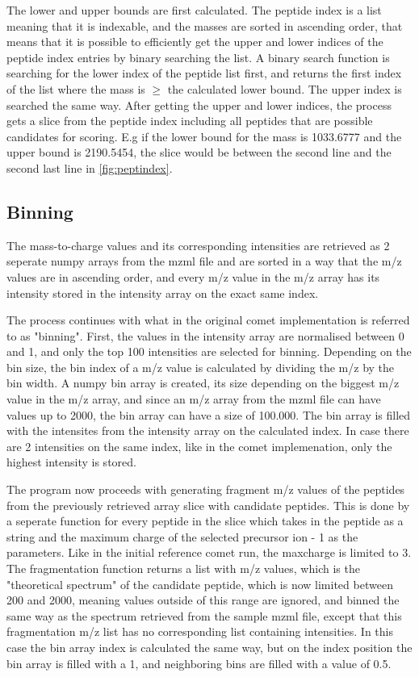 \documentclass[11pt]{article}
\begin{document}
The lower and upper bounds are first calculated. The peptide index is a list meaning that it is indexable, and the masses are sorted in ascending order, that means that it is possible to efficiently get the upper and lower indices of the peptide index entries by binary searching the list. A binary search function is searching for the lower index of the peptide list first, and returns the first index of the list where the mass is $\ge$ the calculated lower bound. The upper index is searched the same way. After getting the upper and lower indices, the process gets a slice from the peptide index including all peptides that are possible candidates for scoring. E.g if the lower bound for the mass is 1033.6777 and the upper bound is 2190.5454,
the slice would be between the second line and the second last line in \cref{fig:peptindex}.

\subsection{Binning}

The mass-to-charge values and its corresponding intensities are retrieved as 2 seperate numpy arrays from the mzml file and are sorted in a way that the m/z values are in ascending order, and every m/z value in the m/z array has its intensity stored in the intensity array on the exact same index.

The process continues with what in the original comet implementation is referred to as "binning". First, the values in the intensity array are normalised between 0 and 1, and only the top 100 intensities are selected for binning. Depending on the bin size, the bin index of a m/z value is calculated by dividing the m/z by the bin width. A numpy bin array is created, its size depending on the biggest m/z value in the m/z array, and since an m/z array from the mzml file can have values up to 2000, the bin array can have a size of 100.000. The bin array is filled with the intensites from the intensity array on the calculated index. In case there are 2 intensities on the same index, like in the comet implemenation, only the highest intensity is stored.

The program now proceeds with generating fragment m/z values of the peptides from the previously retrieved array slice with candidate peptides. This is done by a seperate function for every peptide in the slice which takes in the peptide as a string and the maximum charge of the selected precursor ion - 1 as the parameters. Like in the initial reference comet run, the maxcharge is limited to 3. The fragmentation function returns a list with m/z values, which is the "theoretical spectrum" of the candidate peptide, which is now limited between 200 and 2000, meaning values outside of this range are ignored, and binned the same way as the spectrum retrieved from the sample mzml file, except that this fragmentation m/z list has no corresponding list containing intensities. In this case the bin array index is calculated the same way, but on the index position the bin array is filled with a 1, and neighboring bins are filled with a value of 0.5. 
\end{document}
